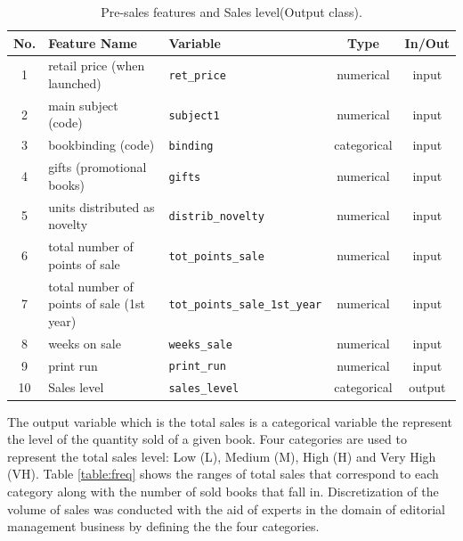 \documentclass[a4paper,10pt,onecolumn,preprint,3p]{elsarticle}
\begin{document}
\begin{table}
\caption{Pre-sales features and Sales level(Output class). } 
\label{tabla:params_pre_sales}
\begin{center}
\begin{tabular}{|c|l|l|c|c|}
\hline 
No. & Feature Name & Variable & Type & In/Out\\
\hline 
1 & retail price (when launched) & \texttt{ret\_price} & numerical & input\\
2 & main subject (code) & \texttt{subject1} & numerical & input\\
3 & bookbinding (code) & \texttt{binding} & categorical & input\\
4 & gifts (promotional books) & \texttt{gifts} & numerical & input\\
5 & units distributed as novelty & \texttt{distrib\_novelty} & numerical & input\\
6 & total number of points of sale & \texttt{tot\_points\_sale} & numerical & input\\
7 & total number of points of sale (1st year) & \texttt{tot\_points\_sale\_1st\_year} & numerical & input\\
8 & weeks on sale & \texttt{weeks\_sale} & numerical & input\\
9 & print run & \texttt{print\_run} & numerical & input\\
\hline 
\hline
10 & Sales level & \texttt{sales\_level} & categorical & output\\
\hline 
\end{tabular}
\end{center}
\end{table}


The output variable which is the total sales is a categorical variable the represent the level of the quantity sold of a given book. Four categories are used to represent the total sales level: Low (L), Medium (M), High (H) and Very High (VH). Table \ref{table:freq} shows the ranges of total sales that correspond to each category along with the number of sold books that fall in. Discretization of the volume of sales was conducted with the aid of experts in the domain of editorial management business by defining the the four categories.

 
\end{document}
